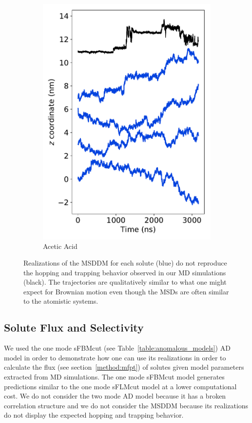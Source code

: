 \documentclass[aps,pre,preprint,groupedaddress,longbibliography]{revtex4-2}
\begin{document}
\begin{figure}
\begin{subfigure}{0.24\textwidth}
  \includegraphics[width=\textwidth]{stacked_msddm_realizations_ACH.pdf}
  \caption{Acetic Acid}\label{fig:stacked_msddm_realizations_ACH}
  \end{subfigure}
  \caption{Realizations of the MSDDM for each solute (blue) do not reproduce
	  the hopping and trapping behavior observed in our MD simulations
	  (black). The trajectories are qualitatively similar to what one
	  might expect for Brownian motion even though the MSDs are often similar
	  to the atomistic systems.
  	  }\label{fig:msddm_eyetest}
  \end{figure}
  
  \subsection{Solute Flux and Selectivity}\label{section:mfpt}
  
  We used the one mode sFBMcut (see Table~\ref{table:anomalous_models}) AD
  model in order to demonstrate how one can use its realizations in order to
  calculate the flux (see section~\ref{method:mfpt}) of solutes given model
  parameters extracted from MD simulations. The one mode sFBMcut model
  generates predictions similar to the one mode sFLMcut model at a lower
  computational cost. We do not consider the two mode AD model because it has a
  broken correlation structure and we do not consider the MSDDM because its
  realizations do not display the expected hopping and trapping behavior. 
\end{document}
